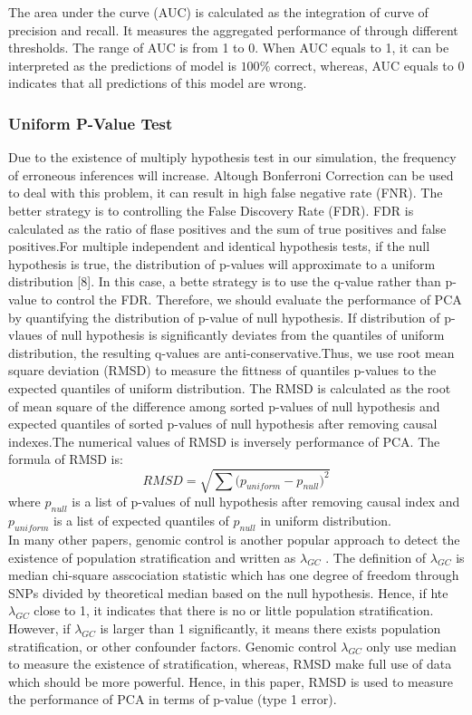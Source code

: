 \documentclass[12pt]{article}
\begin{document}
The area under the curve (AUC) is calculated as the integration of curve of precision and recall. It measures the aggregated performance of through diﬀerent thresholds. The range of AUC is from 1 to 0. When AUC equals to 1, it can be interpreted as the predictions of model is $100\%$ correct, whereas, AUC equals to 0 indicates that all predictions of this model are wrong. 
\subsubsection{Uniform P-Value Test }
Due to the existence of multiply hypothesis test in our simulation, the frequency of erroneous inferences will increase. Altough Bonferroni Correction can be used to deal with this problem, it can result in high false negative rate (FNR). The better strategy is to controlling the False Discovery Rate (FDR). FDR is calculated as the ratio of flase positives and the sum of true positives and false positives.For multiple independent and identical hypothesis tests, if the null hypothesis is true, the distribution of p-values will approximate to a uniform distribution [8]. In this case, a bette strategy is to use the q-value rather than p-value to control the FDR. Therefore, we should evaluate the performance of PCA by quantifying the distribution of p-value of null hypothesis. If distribution of p-vlaues of null hypothesis is significantly deviates from the quantiles of uniform distribution, the resulting q-values are anti-conservative.Thus, we use root mean square deviation (RMSD) to measure the fittness of quantiles p-values to the expected quantiles of uniform distribution. The RMSD is calculated as the root of mean square of the difference among sorted p-values of null hypothesis and expected quantiles of sorted p-values of null hypothesis after removing causal indexes.The numerical values of RMSD is inversely  performance of PCA. The formula of RMSD is:
$$RMSD=\sqrt{\sum{(p_{uniform}-p_{null}})^2}$$
where $p_{null}$ is a list of p-values of null hypothesis after removing causal index and $p_{uniform}$ is a list of expected quantiles of $p_{null}$ in uniform distribution. \\

In many other papers, genomic control is another popular approach to detect the existence of population stratification and written as $\lambda_{GC}$ . The definition of $\lambda_{GC}$ is median chi-square asscociation statistic which has one degree of freedom through SNPs divided by theoretical median based on the null hypothesis. Hence, if hte $\lambda_{GC}$ close to 1, it indicates that there is no or little population stratification. However, if $\lambda_{GC}$ is larger than 1 significantly, it means there exists population stratification, or other confounder factors. Genomic control $\lambda_{GC}$ only use median to measure the existence of stratification, whereas, RMSD make full use of data which should be more powerful. Hence, in this paper, RMSD is used to measure the performance of PCA in terms of p-value (type 1 error).
\end{document}
